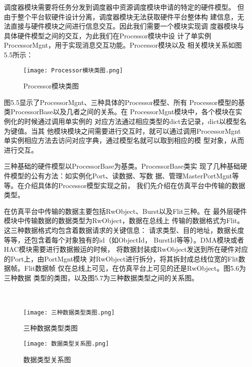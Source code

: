 调度器模块需要将任务分发到调度器中资源调度模块申请的特定的硬件模型。
但由于整个平台软硬件设计分离，调度器模块无法获取硬件平台整体构
建信息，无法直接与硬件模块之间进行信息交互。因此我们需要一个模块实现调
度器模块与具体硬件模型之间的交互，为此我们在Processor模块中设
计了单实例ProcessorMgnt，用于实现消息交互功能。Processor模块以及
相关模块关系如图5.5所示：

\begin{figure}[!h]
    \centering
    \texttt{[image: Processor模块类图.png]}
    \caption{Processor模块类图}
    \label{fig:badge}
\end{figure}

图5.5显示了ProcessorMgnt、三种具体的Processor模型、所有
Processor模型的基类ProcessorBase以及几者之间的关系。在
ProcessorMgnt模块中，各个模块在实例化的时候通过调用单实例的
对应方法通过相应类型的dict去记录，dict以模型名为键值。当其
他模块模块之间需要进行交互时，就可以通过调用ProcessorMgnt
单实例相应方法去访问对应字典，通过模型名就可以取到相应的模
型对象，从而进行交互。

三种基础的硬件模型以ProcessorBase为基类。ProcessorBase类实
现了几种基础硬件模型的公有方法：如实例化Port、读数据、写数
据、管理MasterPortMgnt等等。在介绍具体的Processor模型实现之前，
我们先介绍在仿真平台中传输的数据类型。

在仿真平台中传输的数据主要包括RwObject、Burst以及Flit三种。在
最外层硬件模块中传输数据的数据类型为RwObject，数据在总线上
传输的数据格式为Flit。这三种数据格式均包含着数据请求的关键信息：
请求类型、目的地址，数据长度等等，还包含着每个对象独有的id（如ObjectId，
BurstId等等）。DMA模块或者HAC模块需要进行数据搬运的时候，
将数据封装成RwObject发送到所在硬件对应的Port上，由PortMgnt模块
对RwObject进行拆分，将其拆封成总线位宽的Flit数据帧。Flit数据帧
仅在总线上可见，在仿真平台上可见的还是RwObject。图5.6为三种数据
类型的类图，以及图5.7为三种数据类型之间的关系图。
\\
\\
\\

\begin{figure}
    \centering
    \texttt{[image: 三种数据类型类图.png]}
    \caption{三种数据类型类图}
    \label{fig:badge}
\end{figure}

\begin{figure}
    \centering
    \texttt{[image: 数据类型关系图.png]}
    \caption{数据类型关系图}
    \label{fig:badge}
\end{figure}


